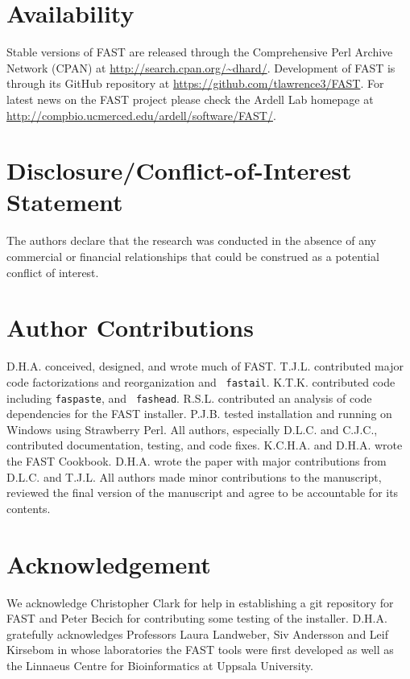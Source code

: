 \documentclass{frontiersSCNS} %
\begin{document}
\section*{Availability}

Stable versions of FAST are released through the Comprehensive Perl
Archive Network (CPAN) at
\url{http://search.cpan.org/~dhard/}. Development of FAST is through
its GitHub repository at \url{https://github.com/tlawrence3/FAST}. For
latest news on the FAST project please check the Ardell Lab homepage
at \url{http://compbio.ucmerced.edu/ardell/software/FAST/}.

\section*{Disclosure/Conflict-of-Interest Statement}

The authors declare that the research was conducted in the absence of
any commercial or financial relationships that could be construed as a
potential conflict of interest.

\section*{Author Contributions}

D.H.A. conceived, designed, and wrote much of FAST. T.J.L. contributed
major code factorizations and reorganization and {\tt
  fastail}. K.T.K. contributed code including {\tt faspaste}, and {\tt
  fashead}. R.S.L. contributed an analysis of code dependencies for
the FAST installer. P.J.B. tested installation and running on Windows
using Strawberry Perl. All authors, especially D.L.C. and C.J.C.,
contributed documentation, testing, and code fixes. K.C.H.A. and
D.H.A. wrote the FAST Cookbook. D.H.A. wrote the paper with major
contributions from D.L.C. and T.J.L. All authors made minor
contributions to the manuscript, reviewed the final version of the
manuscript and agree to be accountable for its contents.

\section*{Acknowledgement}
We acknowledge Christopher Clark for help in establishing a git
repository for FAST and Peter Becich for contributing some testing of
the installer. D.H.A. gratefully acknowledges Professors Laura
Landweber, Siv Andersson and Leif Kirsebom in whose laboratories the
FAST tools were first developed as well as the Linnaeus Centre for
Bioinformatics at Uppsala University.
\end{document}
